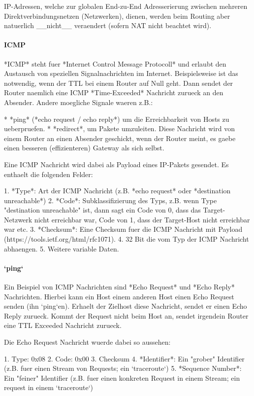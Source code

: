 IP-Adressen, welche zur globalen End-zu-End Adresserierung zwischen mehreren
Direktverbindungsnetzen (Netzwerken), dienen, werden beim Routing aber
natuerlich \_\_nicht\_\_ veraendert (sofern NAT nicht beachtet wird).

\paragraph{ICMP} 

*ICMP* steht fuer *Internet Control Message Protocoll* und erlaubt den Austausch
von speziellen Signalnachrichten im Internet. Beispielsweise ist das notwendig,
wenn der TTL bei einem Router auf Null geht. Dann sendet der Router naemlich
eine ICMP *Time-Exceeded* Nachricht zurueck an den Absender. Andere moegliche
Signale waeren z.B.:

* *ping* (*echo request / echo reply*) um die Erreichbarkeit von Hosts zu
  ueberpruefen.
* *redirect*, um Pakete umzuleiten. Diese Nachricht wird von einem Router an
  einen Absender geschickt, wenn der Router meint, es gaebe einen besseren
  (effizienteren) Gateway als sich selbst.

Eine ICMP Nachricht wird dabei als Payload eines IP-Pakets gesendet. Es enthaelt
die folgenden Felder:

1. *Type*: Art der ICMP Nachricht (z.B. *echo request* oder *destination unreachable*)
2. *Code*: Subklassifizierung des Typs, z.B. wenn Type "destination unreachable"
   ist, dann sagt ein Code von 0, dass das Target-Netzwerk nicht erreichbar war,
   Code von 1, dass der Target-Host nicht erreichbar war etc.
3. *Checksum*: Eine Checksum fuer die ICMP Nachricht mit Payload
   (https://tools.ietf.org/html/rfc1071).
4. 32 Bit die vom Typ der ICMP Nachricht abhaengen.
5. Weitere variable Daten.

\paragraph{`ping`} 

Ein Beispiel von ICMP Nachrichten sind *Echo Request* und *Echo Reply*
Nachrichten. Hierbei kann ein Host einem anderen Host einen Echo Request senden
(ihn `ping`en). Erhaelt der Zielhost diese Nachricht, sendet er einen Echo
Reply zurueck. Kommt der Request nicht beim Host an, sendet irgendein Router
eine TTL Exceeded Nachricht zurueck.

Die Echo Request Nachricht wuerde dabei so aussehen:

1. Type: 0x08
2. Code: 0x00
3. Checksum
4. *Identifier*: Ein "grober" Identifier (z.B. fuer einen Stream von Requests;
   ein `traceroute`)
5. *Sequence Number*: Ein "feiner" Identifier (z.B. fuer einen konkreten Request
   in einem Stream; ein request in einem `traceroute`)

